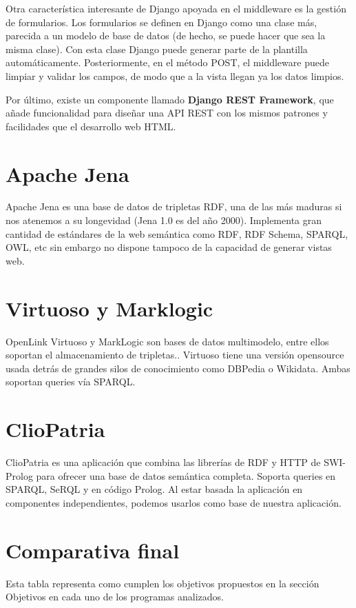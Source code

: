\documentclass[12pt]{report} %
\begin{document}
Otra característica interesante de Django apoyada en el middleware es la gestión de formularios. Los formularios se definen en Django como una clase más, parecida a un modelo de base de datos (de hecho, se puede hacer que sea la misma clase).
Con esta clase Django puede generar parte de la plantilla automáticamente. Posteriormente, en el método POST, el middleware puede limpiar y validar los campos, de modo que a la vista llegan ya los datos limpios.

Por último, existe un componente llamado \textbf{Django REST Framework}, que añade funcionalidad para diseñar una API REST con los mismos patrones y facilidades que el desarrollo web HTML.

\section{Apache Jena}
Apache Jena es una base de datos de tripletas RDF, una de las más maduras si nos atenemos a su longevidad (Jena 1.0 es del año 2000).\cite{couchdb}
Implementa gran cantidad de estándares de la web semántica como RDF, RDF Schema, SPARQL, OWL, etc sin embargo no dispone tampoco de la capacidad de generar vistas web.

\section{Virtuoso y Marklogic}
OpenLink Virtuoso y MarkLogic son bases de datos multimodelo, entre ellos soportan el almacenamiento de tripletas.\cite{virtuoso}\cite{marklogic}.
Virtuoso tiene una versión opensource usada detrás de grandes silos de conocimiento como DBPedia o Wikidata. Ambas soportan queries vía SPARQL.

\section{ClioPatria}
ClioPatria es una aplicación que combina las librerías de RDF y HTTP de SWI-Prolog para ofrecer una base de datos semántica completa.\cite{cliopatria}
Soporta queries en SPARQL, SeRQL y en código Prolog. Al estar basada la aplicación en componentes independientes, podemos usarlos como base
de nuestra aplicación.

\section{Comparativa final}

Esta tabla representa como cumplen los objetivos propuestos en la sección Objetivos en cada uno de los programas analizados.
\end{document}
